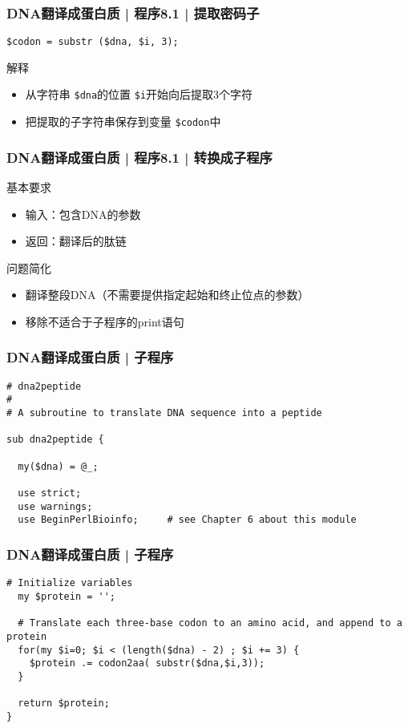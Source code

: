 \begin{frame}[fragile]
  \frametitle{DNA翻译成蛋白质 | 程序8.1 | \alert{提取密码子}}
\begin{lstlisting}
$codon = substr ($dna, $i, 3);
\end{lstlisting}
\pause
\begin{block}{解释}
  \begin{itemize}
    \item 从字符串 \verb|$dna|的位置 \verb|$i|开始向后提取3个字符
    \item 把提取的子字符串保存到变量 \verb|$codon|中
  \end{itemize}
\end{block}
\end{frame}

\begin{frame}
  \frametitle{DNA翻译成蛋白质 | 程序8.1 | 转换成子程序}
  \begin{block}{基本要求}
  \begin{itemize}
    \item 输入：包含DNA的参数
    \item 返回：翻译后的肽链
  \end{itemize}
  \end{block}
  \pause
  \begin{block}{问题简化}
    \begin{itemize}
      \item 翻译整段DNA（不需要提供指定起始和终止位点的参数）
      \item 移除不适合于子程序的print语句
    \end{itemize}
  \end{block}
\end{frame}

\begin{frame}[fragile]
  \frametitle{DNA翻译成蛋白质 | \alert{子程序}}
\begin{lstlisting}[firstnumber=1]
# dna2peptide 
#
# A subroutine to translate DNA sequence into a peptide

sub dna2peptide {

  my($dna) = @_;

  use strict;
  use warnings;
  use BeginPerlBioinfo;     # see Chapter 6 about this module
\end{lstlisting}
\end{frame}

\begin{frame}[fragile]
  \frametitle{DNA翻译成蛋白质 | \alert{子程序}}
\begin{lstlisting}[firstnumber=13]
  # Initialize variables
  my $protein = '';

  # Translate each three-base codon to an amino acid, and append to a protein 
  for(my $i=0; $i < (length($dna) - 2) ; $i += 3) {
    $protein .= codon2aa( substr($dna,$i,3));
  }

  return $protein;
}
\end{lstlisting}
\end{frame}

